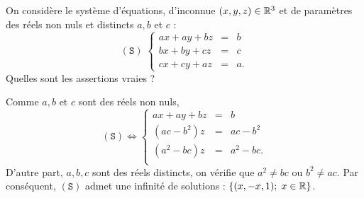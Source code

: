 \begin{question}
On considère le système d'équations, d'inconnue $(x,y,z)\in \mathbb{R}^3$ et de paramètres des réels non nuls et distincts $a,b$ et $c$ :
$$(\mathtt{S}) \; \left\{\begin{array}{rcc}
ax+ay+bz&=&b\\
bx+by+cz&=&c\\ 
cx+cy+az&=&a.\end{array}\right.$$
Quelles sont les assertions vraies ?
\begin{answers}  
\end{answers}
\begin{explanations} Comme $a,b$ et $c$ sont des réels non nuls, 
$$(\mathtt{S}) \Leftrightarrow  
\left\{\begin{array}{rcc}
ax+ay+bz&=&b\\
(ac-b^2)z&=&ac-b^2\\ 
(a^2-bc)z&=&a^2-bc.\\ 
\end{array}\right.$$
D'autre part, $a,b,c$ sont des réels distincts, on vérifie que $a^2\neq bc$ ou $b^2 \neq ac$. Par conséquent, 
$(\mathtt{S})$ admet une infinité de solutions :
$\{(x,-x,1); \; x \in \mathbb{R}\}$.
\end{explanations}
\end{question}

